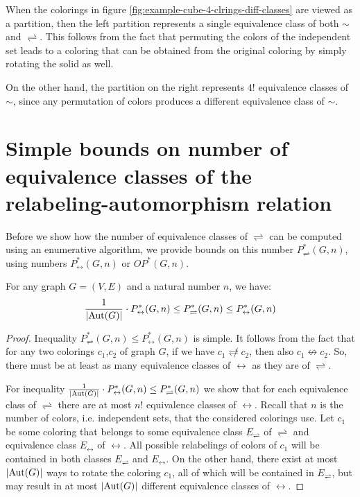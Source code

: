 When the colorings in figure \ref{fig:example-cube-4-clrings-diff-classes} are viewed as a partition, then the left partition represents a single equivalence class of both $\sim$ and $\rightleftharpoons$. This follows from the fact that permuting the colors of the independent set leads to a coloring that can be obtained from the original coloring by simply rotating the solid as well.

On the other hand, the partition on the right represents $4!$ equivalence classes of $\sim$, since any permutation of colors produces a different equivalence class of $\sim$.

\section{Simple bounds on number of equivalence classes of the relabeling-automorphism relation}

Before we show how the number of equivalence classes of $\rightleftharpoons$ can be computed using an enumerative algorithm, we provide bounds on this number $P^*_\rightleftharpoons(G,n)$, using numbers $P^*_\leftrightarrow(G,n)$ or $OP^*(G,n)$.

\begin{claim}\label{clm:relabeling-bound}
    For any graph $G=(V,E)$ and a natural number $n$, we have: $$\frac{1}{\left|{\operatorname{Aut}(G)}\right|} \cdot P^*_\leftrightarrow(G,n) \leq P^*_\rightleftharpoons(G,n) \leq P^*_\leftrightarrow(G,n)$$ 
\end{claim}

\begin{proof}

Inequality $P^*_\rightleftharpoons(G,n) \leq P^*_\leftrightarrow(G,n)$ is simple. It follows from the fact that for any two colorings $c_1$,$c_2$ of graph $G$, if we have $c_1 \not\rightleftharpoons c_2$, then also $c_1 \not\leftrightarrow c_2$. So, there must be at least as many equivalence classes of $\leftrightarrow$ as they are of $\rightleftharpoons$.

For inequality $\frac{1}{\left|{\operatorname{Aut}(G)}\right|} \cdot P^*_\leftrightarrow(G,n) \leq P^*_\rightleftharpoons(G,n)$ we show that for each equivalence class of $\rightleftharpoons$ there are at most $n!$ equivalence classes of $\leftrightarrow$. Recall that $n$ is the number of colors, i.e. independent sets, that the considered colorings use. Let $c_1$ be some coloring that belongs to some equivalence class $E_\rightleftharpoons$ of $\rightleftharpoons$ and equivalence class $E_\leftrightarrow$ of $\leftrightarrow$. All possible relabelings of colors of $c_1$ will be contained in both classes $E_\rightleftharpoons$ and $E_\leftrightarrow$. On the other hand, there exist at most $\left|{\operatorname{Aut}(G)}\right|$ ways to rotate the coloring $c_1$, all of which will be contained in $E_\rightleftharpoons$, but may result in at most $\left|{\operatorname{Aut}(G)}\right|$ different equivalence classes of $\leftrightarrow$.

\end{proof}

